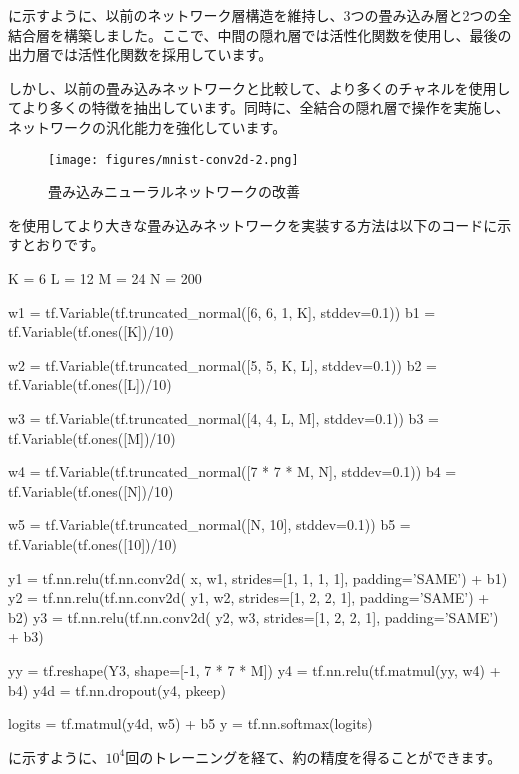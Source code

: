 \begin{content}
\begin{content}
に示すように、以前のネットワーク層構造を維持し、3つの畳み込み層と2つの全結合層を構築しました。ここで、中間の隠れ層では活性化関数を使用し、最後の出力層では活性化関数を採用しています。

しかし、以前の畳み込みネットワークと比較して、より多くのチャネルを使用してより多くの特徴を抽出しています。同時に、全結合の隠れ層で操作を実施し、ネットワークの汎化能力を強化しています。

\begin{figure}[H]
\centering
\texttt{[image: figures/mnist-conv2d-2.png]}
\caption{畳み込みニューラルネットワークの改善}
 \label{fig:mnist-conv2d-2}
\end{figure}

\tf{}を使用してより大きな畳み込みネットワークを実装する方法は以下のコードに示すとおりです。

\begin{leftbar}
\begin{python}
K = 6
L = 12
M = 24
N = 200

w1 = tf.Variable(tf.truncated_normal([6, 6, 1, K], stddev=0.1))
b1 = tf.Variable(tf.ones([K])/10)

w2 = tf.Variable(tf.truncated_normal([5, 5, K, L], stddev=0.1))
b2 = tf.Variable(tf.ones([L])/10)

w3 = tf.Variable(tf.truncated_normal([4, 4, L, M], stddev=0.1))
b3 = tf.Variable(tf.ones([M])/10)

w4 = tf.Variable(tf.truncated_normal([7 * 7 * M, N], stddev=0.1))
b4 = tf.Variable(tf.ones([N])/10)

w5 = tf.Variable(tf.truncated_normal([N, 10], stddev=0.1))
b5 = tf.Variable(tf.ones([10])/10)

y1 = tf.nn.relu(tf.nn.conv2d(
       x,  w1, strides=[1, 1, 1, 1], padding='SAME') + b1)
y2 = tf.nn.relu(tf.nn.conv2d(
       y1, w2, strides=[1, 2, 2, 1], padding='SAME') + b2)
y3 = tf.nn.relu(tf.nn.conv2d(
       y2, w3, strides=[1, 2, 2, 1], padding='SAME') + b3)

yy = tf.reshape(Y3, shape=[-1, 7 * 7 * M])
y4 = tf.nn.relu(tf.matmul(yy, w4) + b4)
y4d = tf.nn.dropout(y4, pkeep)

logits = tf.matmul(y4d, w5) + b5
y = tf.nn.softmax(logits)
\end{python}
\end{leftbar}

に示すように、$10^4$回のトレーニングを経て、約の精度を得ることができます。


\end{content}
\end{content}

